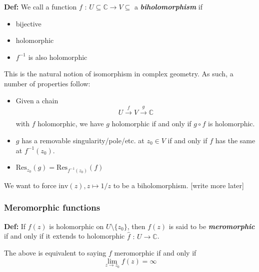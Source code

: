 \documentclass[11pt]{article}
\newcommand{\C}{\mathbb{C}}
\begin{document}
\vskip 0.5cm
\begin{bluebox}
    \textbf{Def:} We call a function $f \text{ : } U \subseteq \C \rightarrow V \subseteq$ a \emph{\textbf{biholomorphism}} if 
    \begin{itemize}
        \item bijective
        \item holomorphic
        \item $f^{-1}$ is also holomorphic
    \end{itemize}
\end{bluebox}

This is the natural notion of isomorphism in complex geometry. As such, a number of properties follow:

\begin{redbox}
    \begin{itemize}
        \item Given a chain
        \[ U \xrightarrow[]{f} V \xrightarrow[]{g} \C \] with $f$ holomorphic, we have $g$ holomorphic if and only if $g \circ f$ is holomorphic.
        \item $g$ has a removable singularity/pole/etc. at $z_0 \in V$ if and only if $f$ has the same at $f^{-1}(z_0)$.
        \item $\mathrm{Res}_{z_0}(g) = \mathrm{Res}_{f^{-1}(z_0)}(f)$
    \end{itemize}
\end{redbox}

\vskip 0.5cm
We want to force $\mathrm{inv}(z), z \mapsto 1/z$ to be a biholomorphism. [write more later]

\vskip 0.5cm
\subsubsection{Meromorphic functions}

\vskip 0.5cm
\begin{bluebox}
    \textbf{Def:} If $f(z)$ is holomorphic on $U \setminus \{z_0\}$, then $f(z)$ is said to be \emph{\textbf{meromorphic}} if and only if it extends to holomorphic $\hat{f} \text{ : } U \rightarrow \hat{\C}$. 

    \vskip 0.5cm
    The above is equivalent to saying $f$ meromorphic if and only if 
    \[ \lim_{z \rightarrow z_0} f(z) = \infty \]
\end{bluebox}

\end{document}
